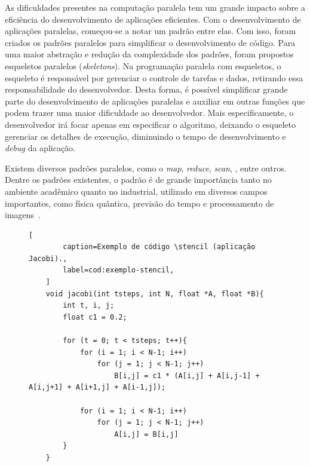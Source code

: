 As dificuldades presentes na computação paralela tem um grande impacto sobre a
eficiência do desenvolvimento de aplicações eficientes. Com o
desenvolvimento de aplicações paralelas, começou-se a notar um padrão entre
elas. Com isso, foram criados os padrões paralelos para simplificar o
desenvolvimento de código.
Para uma maior abstração e redução da complexidade dos padrões, foram propostos
esqueletos paralelos (\textit{skeletons}). Na programação paralela com esqueletos, o esqueleto é responsável por
gerenciar o controle de tarefas e dados, retirando essa responsabilidade do
desenvolvedor. Desta forma, é possível simplificar grande parte do
desenvolvimento de aplicações paralelas e auxiliar em outras funções que podem
trazer uma maior dificuldade ao desenvolvedor. Mais especificamente, o
desenvolvedor irá focar apenas em especificar o algoritmo, deixando o esqueleto
gerenciar os detalhes de execução, diminuindo o tempo de desenvolvimento e
\textit{debug} da aplicação.

Existem diversos padrões paralelos, como o \textit{map}, \textit{reduce},
\textit{scan}, \stencil, entre outros. Dentre os padrões existentes, o
padrão \stencil é de grande importância tanto no ambiente acadêmico quanto no
industrial, utilizado em diversos campos importantes, como física quântica,
previsão do tempo e processamento de imagens~\cite{pereira15}.

\begin{figure}[t]
	\begin{lstlisting}[
		caption=Exemplo de código \stencil (aplicação Jacobi).,
		label=cod:exemplo-stencil,
	]
	void jacobi(int tsteps, int N, float *A, float *B){
		int t, i, j;
		float c1 = 0.2;

		for (t = 0; t < tsteps; t++){
			for (i = 1; i < N-1; i++)
				for (j = 1; j < N-1; j++)
					B[i,j] = c1 * (A[i,j] + A[i,j-1] + A[i,j+1] + A[i+1,j] + A[i-1,j]);

			for (i = 1; i < N-1; i++)
				for (j = 1; j < N-1; j++)
					A[i,j] = B[i,j]
		}
	}
\end{lstlisting}
\end{figure}

